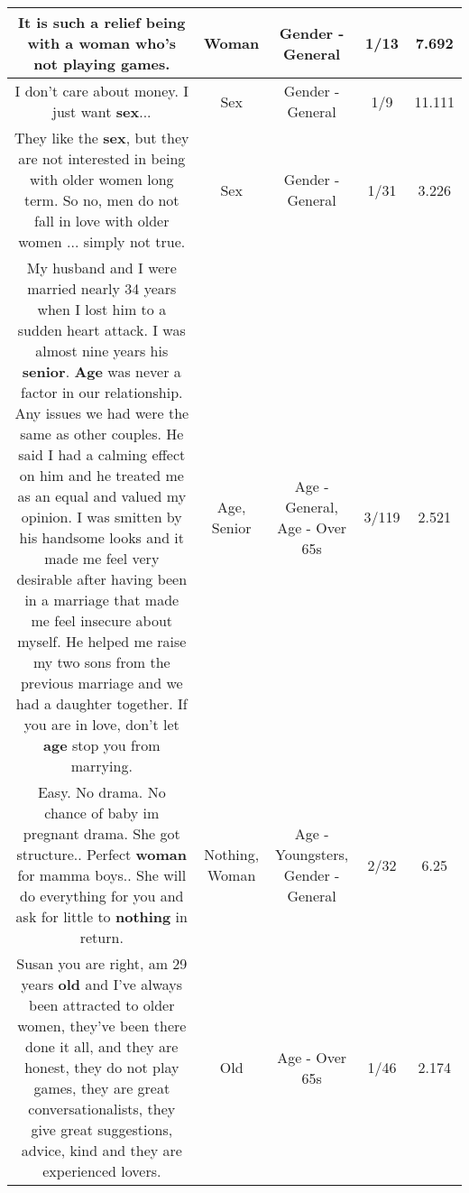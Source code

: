 \documentclass[11pt]{article}
\newlength\mylength
\begin{document}
\begin{center}
\begin{longtable}{|C{.65\mylength}|C{.30\mylength}|C{.12\mylength}|C{.12\mylength}|C{.12\mylength}|}
  \small It is such a relief being with a \textbf{woman} who's not playing games.\normalsize   & Woman & Gender - General & 1/13 & 7.692 \\  \hline
  \small I don't care about money. I just want \textbf{sex}...\normalsize   & Sex & Gender - General & 1/9 & 11.111 \\  \hline
  \small They like the \textbf{sex}, but they are not interested in being with older women long term. So no, men do not fall in love with older women ... simply not true.\normalsize   & Sex & Gender - General & 1/31 & 3.226 \\  \hline
  \small My husband and I were married nearly 34 years when I lost him to a sudden heart attack.  I was almost nine years his \textbf{senior}.  \textbf{Age} was never a factor in our relationship. Any issues we had were the same as other couples.  He said I had a calming effect on him and he treated me as an equal and valued my opinion.  I was smitten by his handsome looks and it made me feel very desirable after having been in a marriage that made me feel insecure about myself. He helped me raise my two sons from the previous marriage and we had a daughter together.  If you are in love, don't let \textbf{age} stop you from marrying.\normalsize   & Age, Senior & Age - General, Age - Over 65s & 3/119 & 2.521 \\  \hline
  \small Easy. No drama. No chance of baby im pregnant drama. She got structure.. Perfect \textbf{woman} for mamma boys.. She will do everything for you and ask for little to \textbf{nothing} in return.\normalsize   & Nothing, Woman & Age - Youngsters, Gender - General & 2/32 & 6.25 \\  \hline
  \small Susan you are right, am 29 years \textbf{old} and I've always been attracted to older women,  they've been there done it all, and they are honest, they do not play games, they are great conversationalists, they give great suggestions,  advice, kind and they are experienced lovers.\normalsize   & Old & Age - Over 65s & 1/46 & 2.174 \\  \hline

\end{longtable}
\end{center}
\end{document}
